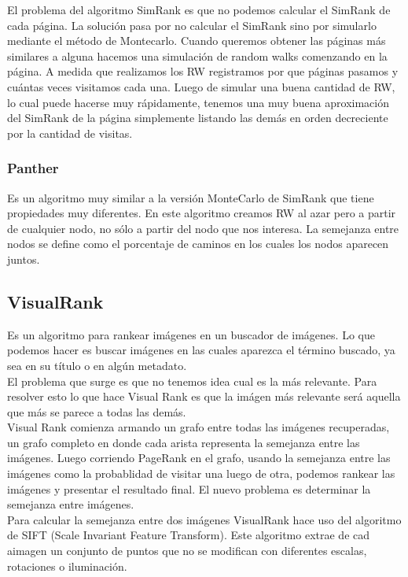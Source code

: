 \documentclass[titlepage,a4paper]{article}
\begin{document}
El problema del algoritmo SimRank es que no podemos calcular el SimRank de cada página. La solución pasa por no calcular el SimRank sino por simularlo mediante el método de Montecarlo. Cuando queremos obtener las páginas más similares a alguna hacemos una simulación de random walks comenzando en la página. A medida que realizamos los RW registramos por que páginas pasamos y cuántas veces visitamos cada una. Luego de simular una buena cantidad de RW, lo cual puede hacerse muy rápidamente, tenemos una muy buena aproximación del SimRank de la página simplemente listando las demás en orden decreciente por la cantidad de visitas. 

\subsubsection*{Panther}
Es un algoritmo muy similar a la versión MonteCarlo de SimRank que tiene propiedades muy diferentes. En este algoritmo creamos RW al azar pero a partir de cualquier nodo, no sólo a partir del nodo que nos interesa. La semejanza entre nodos se define como el porcentaje de caminos en los cuales los nodos aparecen juntos. 

\subsection*{VisualRank}
Es un algoritmo para rankear imágenes en un buscador de imágenes. Lo que podemos hacer es buscar imágenes en las cuales aparezca el término buscado, ya sea en su título o en algún metadato. \\

El problema que surge es que no tenemos idea cual es la más relevante. Para resolver esto lo que hace Visual Rank es que la imágen más relevante será aquella que más se parece a todas las demás. \\

Visual Rank comienza armando un grafo entre todas las imágenes recuperadas, un grafo completo en donde cada arista representa la semejanza entre las imágenes. Luego corriendo PageRank en el grafo, usando la semejanza entre las imágenes como la probablidad de visitar una luego de otra, podemos rankear las imágenes y presentar el resultado final. El nuevo problema es determinar la semejanza entre imágenes. \\

Para calcular la semejanza entre dos imágenes VisualRank hace uso del algoritmo de SIFT (Scale Invariant Feature Transform). Este algoritmo extrae de cad aimagen un conjunto de puntos que no se modifican con diferentes escalas, rotaciones o iluminación. \\
\end{document}
